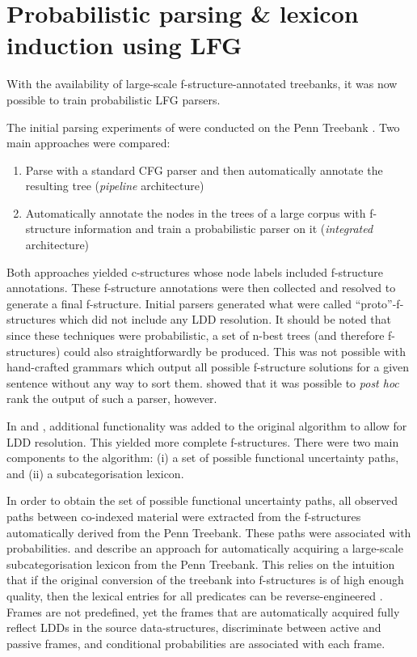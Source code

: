 \documentclass[output=paper,hidelinks]{langscibook}
\begin{document}
\section{Probabilistic parsing \& lexicon induction using LFG}
\label{sec:GrammarInduction:5}
With the availability of large-scale f-structure-annotated treebanks, it was now possible to train probabilistic LFG parsers. 

The initial parsing experiments of \citet{cahilletal02} were conducted on the Penn Treebank \citep{marcus1994penn}. Two main approaches were compared: 
\begin{enumerate}
    \item Parse with a standard CFG parser and then automatically annotate the resulting tree ({\em pipeline} architecture)
    \item Automatically annotate the nodes in the trees of a large corpus with f-structure information and train a probabilistic parser on it ({\em integrated} architecture) 
\end{enumerate}

Both approaches yielded c-structures whose node labels included f-structure annotations. These f-structure annotations were then collected and resolved to generate a final f-structure. Initial parsers generated what were called ``proto''-f-structures which did not include any LDD resolution. It should be noted that since these techniques were probabilistic, a set of n-best trees (and therefore f-structures) could also straightforwardly be produced. This was not possible with hand-crafted grammars which output all possible f-structure solutions for a given sentence without any way to sort them. \citet{Riezler2002King} showed that it was possible to {\em post hoc} rank the output of such a parser, however. 

In \citet{Cahill04thesis} and \citet{cahill-EtAl:2004:ACL}, additional functionality was added to the original algorithm to allow for LDD resolution. This yielded more complete f-structures. There were two main components to the algorithm: (i) a set of possible functional uncertainty paths, and (ii) a subcategorisation lexicon. 

In order to obtain the set of possible functional uncertainty paths, all observed paths between co-indexed material were extracted from the f-structures automatically derived from the Penn Treebank. These paths were associated with probabilities. \citet{odonovanetal:04} and \citet{odonovan:2006} describe an approach for automatically acquiring a large-scale subcategorisation lexicon from the Penn Treebank. This relies on the intuition that if the original conversion of the treebank into f-structures is of high enough quality, then the lexical entries for all predicates can be reverse-engineered \citep{vanGetal:99}. Frames are not predefined, yet the frames that are automatically acquired fully reflect LDDs in the source data-structures, discriminate between active and passive frames, and  conditional probabilities are associated with each frame. 
\end{document}
